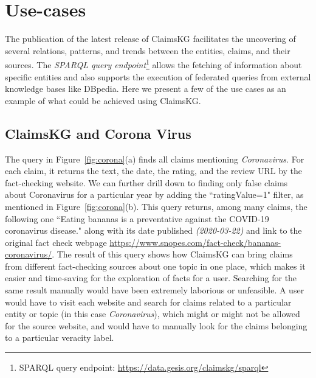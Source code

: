 \documentclass[
]{ceurart}
\begin{document}
\section{Use-cases}
\vspace{-2mm}
The publication of the latest release of ClaimsKG facilitates the uncovering of several %
relations, patterns, and trends between the entities, claims, and their sources. The  \textit{SPARQL query endpoint}\footnote{SPARQL query endpoint: \url{https://data.gesis.org/claimskg/sparql}} allows the fetching of information about specific entities and also supports the execution of federated queries from external knowledge bases like DBpedia. Here we present a few of the use cases as an example of what could be achieved using ClaimsKG. 
\vspace{-4mm}
\subsection{ClaimsKG and Corona Virus}
\vspace{-2mm}
The query in Figure~\ref{fig:corona}(a) finds all claims mentioning \textit{Coronavirus}. For each claim, it returns the text, the date, the rating, and the review URL by the fact-checking website. We can further drill down to finding only false claims about Coronavirus for a particular year by adding the ``ratingValue=1" filter, as mentioned in Figure~\ref{fig:corona}(b). This query returns, among many claims, the following one ``Eating bananas is a preventative against the COVID-19 coronavirus disease." along with its date published \textit{(2020-03-22)} and link to the original fact check webpage \url{https://www.snopes.com/fact-check/bananas-coronavirus/}. The result of this query shows how ClaimsKG can bring claims from different fact-checking sources about one topic in one place, which makes it easier and time-saving for the exploration of facts for a user. Searching for the same result manually would have been extremely laborious or unfeasible. A user would have to visit each website and search for claims related to a particular entity or topic (in this case \textit{Coronavirus}), which might or might not be allowed for the source website, and would have to manually look for the claims belonging to a particular veracity label.
\end{document}

